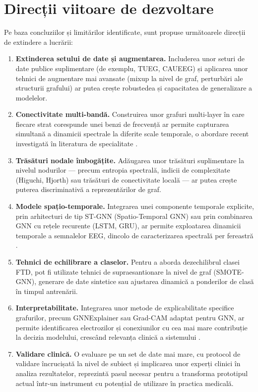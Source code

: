 \documentclass[12pt,a4paper]{report}
\theoremstyle{definition}
\theoremstyle{remark}
\begin{document}
\section{Direcții viitoare de dezvoltare}

Pe baza concluziilor și limitărilor identificate, sunt propuse următoarele
direcții de extindere a lucrării:

\begin{enumerate}
    \item \textbf{Extinderea setului de date și augmentarea.} Includerea unor
    seturi de date publice suplimentare (de exemplu, TUEG, CAUEEG) și aplicarea
    unor tehnici de augmentare mai avansate (mixup la nivel de graf, perturbări
    ale structurii grafului) ar putea crește robustedea și capacitatea de
    generalizare a modelelor.

    \item \textbf{Conectivitate multi-bandă.} Construirea unor grafuri multi-layer
    în care fiecare strat corespunde unei benzi de frecvență ar permite capturarea
    simultană a dinamicii spectrale la diferite scale temporale, o abordare recent
    investigată în literatura de specialitate \cite{klepl2023gnn}.

    \item \textbf{Trăsături nodale îmbogățite.} Adăugarea unor trăsături
    suplimentare la nivelul nodurilor — precum entropia spectrală, indicii de
    complexitate (Higuchi, Hjorth) sau trăsături de conectivitate locală — ar
    putea crește puterea discriminativă a reprezentărilor de graf.

    \item \textbf{Modele spațio-temporale.} Integrarea unei componente temporale
    explicite, prin arhitecturi de tip ST-GNN (Spatio-Temporal GNN) sau prin
    combinarea GNN cu rețele recurente (LSTM, GRU), ar permite exploatarea
    dinamicii temporale a semnalelor EEG, dincolo de caracterizarea spectrală
    per fereastră \cite{rahman2025advancement}.

    \item \textbf{Tehnici de echilibrare a claselor.} Pentru a aborda
    dezechilibrul clasei FTD, pot fi utilizate tehnici de supraesantionare la
    nivel de graf (SMOTE-GNN), generare de date sintetice sau ajustarea dinamică
    a ponderilor de clasă în timpul antrenării.

    \item \textbf{Interpretabilitate.} Integrarea unor metode de explicabilitate
    specifice grafurilor, precum GNNExplainer sau Grad-CAM adaptat pentru GNN,
    ar permite identificarea electrozilor și conexiunilor cu cea mai mare
    contribuție la decizia modelului, crescând relevanța clinică a sistemului
    \cite{hu2024self}.

    \item \textbf{Validare clinică.} O evaluare pe un set de date mai mare,
    cu protocol de validare încrucișată la nivel de subiect și implicarea unor
    experți clinici în analiza rezultatelor, reprezintă pasul necesar pentru
    a transforma prototipul actual într-un instrument cu potențial de utilizare
    în practica medicală.
\end{enumerate}



%
\end{document}
